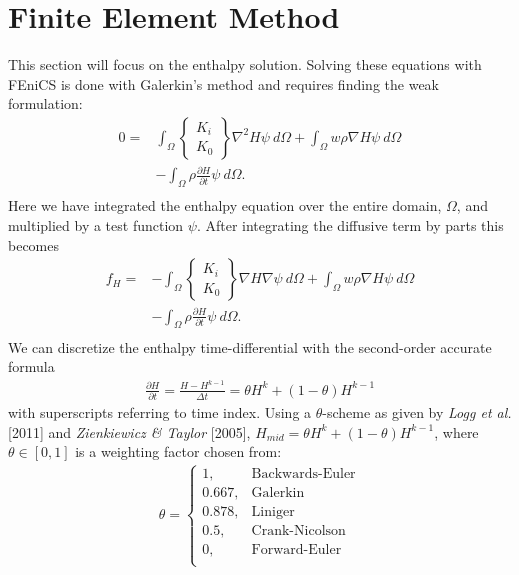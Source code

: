 \documentclass{article}%
\begin{document}
\section{Finite Element Method}

This section will focus on the enthalpy solution.  Solving these equations with FEniCS is done with Galerkin's method and requires finding the weak formulation:
\begin{align*}
    0 =
    &\int_{\Omega} 
      \begin{Bmatrix}
        K_i\\
        K_0
      \end{Bmatrix}
      \nabla^2 H \psi\ d \Omega 
    + \int_{\Omega}w \rho \nabla H \psi\ d \Omega \\
    &- \int_{\Omega} {\rho \frac{\partial H}{\partial t}} \psi\ d \Omega. \\
\end{align*}
Here we have integrated the enthalpy equation over the entire domain, $\Omega$, and multiplied by a test function $\psi$.  After integrating the diffusive term by parts this becomes
\begin{align*}
    f_H =
    &- \int_{\Omega} 
        \begin{Bmatrix}
          K_i\\
          K_0
        \end{Bmatrix}
        \nabla H \nabla \psi\ d \Omega 
    + \int_{\Omega}w \rho \nabla H \psi\ d \Omega \\
    &- \int_{\Omega} {\rho \frac{\partial H}{\partial t}} \psi\ d \Omega. \\
\end{align*}
We can discretize the enthalpy time-differential with the second-order accurate formula
\begin{align*}
  \frac{\partial H}{\partial t} = \frac{H - H^{k-1}}{\Delta t} = \theta H^{k}  + (1-\theta) H^{k-1}
\end{align*}
with superscripts referring to time index.  Using a $\theta$-scheme as given by \emph{Logg et al.} [2011] and \emph{Zienkiewicz \& Taylor} [2005], $H_{mid} = \theta H^{k}  + (1-\theta) H^{k-1}$, where $\theta \in [0,1]$ is a weighting factor chosen from: 
\begin{align*}
    \theta = 
    \begin{cases}
      1,       & \text{Backwards-Euler}\\
      0.667,   & \text{Galerkin}\\
      0.878,   & \text{Liniger}\\
      0.5,     & \text{Crank-Nicolson}\\
      0,       & \text{Forward-Euler}\\
    \end{cases}
\end{align*}
\end{document}
